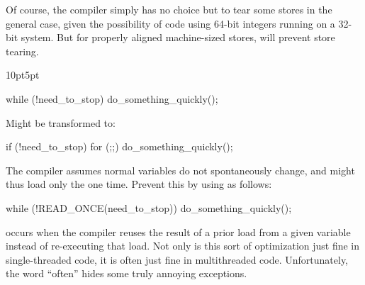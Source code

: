 \begin{description}[labelsep=.4em]
Of course, the compiler simply has no choice but to tear some stores
in the general case, given
the possibility of code using 64-bit integers running on a 32-bit system.
But for properly aligned machine-sized stores,  will
prevent store tearing.

\begin{listing}[tb]
\begin{adjustwidth}{10pt}{5pt}
\footnotesize
\renewcommand{\myfvline}{A\arabic{FancyVerbLine}}
\begin{fcvlabel}
\begin{VerbatimT}[commandchars=\\\[\]]
while (!need_to_stop)			\lnlbl[A1]
	do_something_quickly();		\lnlbl[A2]
\end{VerbatimT}
Might be transformed to:
\renewcommand{\myfvline}{B\arabic{FancyVerbLine}}
\begin{VerbatimT}[commandchars=\\\[\]]
if (!need_to_stop)			\lnlbl[B1]
	for (;;)			\lnlbl[B2]
		do_something_quickly();	\lnlbl[B3]
\end{VerbatimT}
The compiler assumes normal variables do not spontaneously change,
and might thus load  only the one time.
Prevent this by using  as follows:
\renewcommand{\myfvline}{C\arabic{FancyVerbLine}}
\begin{VerbatimT}[commandchars=\\\[\]]
while (!READ_ONCE(need_to_stop))	\lnlbl[C1]
	do_something_quickly();		\lnlbl[C2]
\end{VerbatimT}
\end{fcvlabel}
\end{adjustwidth}
\caption{Infinite Load Fusing}
\label{lst:toolsoftrade:Infinite Load Fusing}
\end{listing}

\item[Load fusing] occurs when the compiler reuses the result of a prior
load from a given variable instead of re-executing that load.
Not only is this sort of optimization just fine in single-threaded
code, it is often just fine in multithreaded code.
Unfortunately, the word ``often'' hides some truly annoying exceptions.

\end{description}
